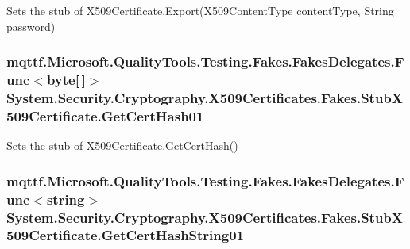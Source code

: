Sets the stub of X509\-Certificate.\-Export(\-X509\-Content\-Type content\-Type, String password)

\hypertarget{class_system_1_1_security_1_1_cryptography_1_1_x509_certificates_1_1_fakes_1_1_stub_x509_certificate_a2f45348171ffa48317014236f1f42af8}{
\subsubsection[{Get\-Cert\-Hash01}]{\setlength{\rightskip}{0pt plus 5cm}mqttf.\-Microsoft.\-Quality\-Tools.\-Testing.\-Fakes.\-Fakes\-Delegates.\-Func$<$byte\mbox{[}$\,$\mbox{]}$>$ System.\-Security.\-Cryptography.\-X509\-Certificates.\-Fakes.\-Stub\-X509\-Certificate.\-Get\-Cert\-Hash01}}\label{class_system_1_1_security_1_1_cryptography_1_1_x509_certificates_1_1_fakes_1_1_stub_x509_certificate_a2f45348171ffa48317014236f1f42af8}


Sets the stub of X509\-Certificate.\-Get\-Cert\-Hash()

\hypertarget{class_system_1_1_security_1_1_cryptography_1_1_x509_certificates_1_1_fakes_1_1_stub_x509_certificate_a152fb7d1fe51628f800db6d3ff7d20b6}{
\subsubsection[{Get\-Cert\-Hash\-String01}]{\setlength{\rightskip}{0pt plus 5cm}mqttf.\-Microsoft.\-Quality\-Tools.\-Testing.\-Fakes.\-Fakes\-Delegates.\-Func$<$string$>$ System.\-Security.\-Cryptography.\-X509\-Certificates.\-Fakes.\-Stub\-X509\-Certificate.\-Get\-Cert\-Hash\-String01}}\label{class_system_1_1_security_1_1_cryptography_1_1_x509_certificates_1_1_fakes_1_1_stub_x509_certificate_a152fb7d1fe51628f800db6d3ff7d20b6}


